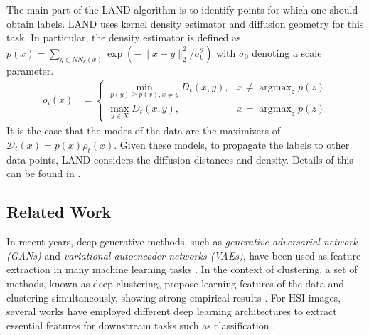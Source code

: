 \documentclass{article}
\DeclareMathOperator*{\argmax}{argmax} %
\newcommand{\Dt}{\mathcal{D}_{t}}
\begin{document}
The main part of the LAND algorithm is to identify points for which one should obtain labels. LAND uses kernel density estimator and diffusion geometry for this task. In particular, the density estimator is defined as $p(x)=\sum_{y\in NN_{k}(x)}\exp(-\|x-y\|_{2}^{2}/\sigma_{0}^{2})$ with $\sigma_0$ denoting a scale parameter.
\begin{align}\label{eqn:rho}
\rho_{t}(x) &=
\begin{cases}
\displaystyle\min_{p(y)\ge p(x), x\neq y} D_{t}(x,y), &x\neq \displaystyle\argmax_{z}p(z) \\
\displaystyle\max_{y\in X} D_{t}(x,y), & x=\displaystyle\argmax_{z}p(z)
\end{cases}
\end{align} 
It is the case that the modes of the data are the maximizers of $\Dt(x)=p(x)\rho_{t}(x)$.  Given these models, to propagate the labels to other data points, LAND considers the diffusion distances and density.  Details of this can be found in \cite{Maggioni2019_LAND}. 


\subsection{Related Work}
In recent years, deep generative methods, such as \emph{generative adversarial network (GANs)} and \emph{variational autoencoder networks (VAEs)}, have been used as feature extraction in many machine learning tasks \cite{ehsan2017infinite,makhzani2015adversarial}. In the context of clustering, a set of methods, known as deep clustering, propose learning features of the data and clustering simultaneously, showing strong empirical results \cite{tian2014learning,song2013auto,xie2016unsupervised}. For HSI images, several works have employed different deep learning architectures to extract essential features for downstream tasks such as classification \cite{chen2014deep,chen2016deep,li2017spectral,he2017multi,paoletti2019deep}. 
\end{document}
